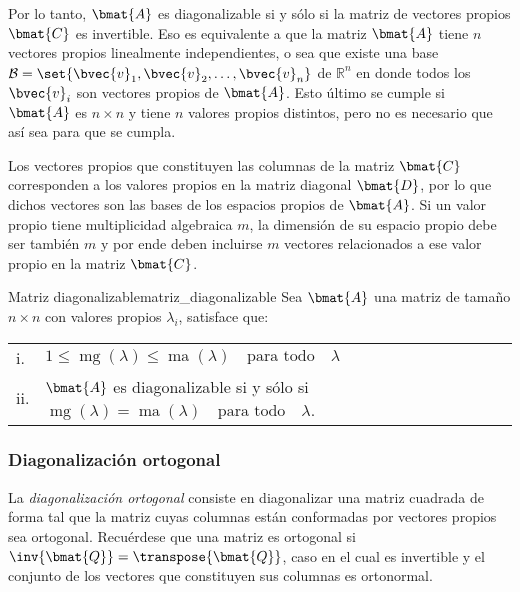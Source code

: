 \documentclass{fmbnotes}
\begin{document}
Por lo tanto, \(\bmat{A}\) es diagonalizable si y sólo si la matriz de vectores propios \(\bmat{C}\) es invertible. Eso es equivalente a que la matriz \(\bmat{A}\) tiene \(n\) vectores propios linealmente independientes, o sea que existe una base \(\mathcal{B}=\set{\bvec{v}_1,\bvec{v}_2,\ldots,\bvec{v}_n}\) de \(\mathbb{R}^{n}\) en donde todos los \(\bvec{v}_i\) son vectores propios de \(\bmat{A}\). Esto último se cumple si \(\bmat{A}\) es \(n\times n\) y tiene \(n\) valores propios distintos, pero no es necesario que así sea para que se cumpla.

Los vectores propios que constituyen las columnas de la matriz  \(\bmat{C}\) corresponden a los valores propios en la matriz diagonal \(\bmat{D}\), por lo que dichos vectores son las bases de los espacios propios de \(\bmat{A}\). Si un valor propio tiene multiplicidad algebraica \(m\), la dimensión de su espacio propio debe ser también \(m\) y por ende deben incluirse \(m\) vectores relacionados a ese valor propio en la matriz \(\bmat{C}\).

\begin{teorema}{Matriz diagonalizable}{matriz_diagonalizable}
	Sea \(\bmat{A}\) una matriz de tamaño \(n\times n\) con valores propios \(\lambda_i\), satisface que:
	\begin{longtable}{ll}
		\rule[1ex]{0pt}{2.5ex}i.&\(1 \leq \operatorname{mg}(\lambda)\leq\operatorname{ma}(\lambda) \quad \text{para todo} \quad \lambda\) \\
		\rule[1ex]{0pt}{2.5ex}ii.&\(\bmat{A}\) es diagonalizable si y sólo si \( \operatorname{mg}(\lambda)=\operatorname{ma}(\lambda) \quad \text{para todo} \quad \lambda \). \\
	\end{longtable}
\end{teorema}

\subsubsection{Diagonalización ortogonal}

La \emph{diagonalización ortogonal} consiste en diagonalizar una matriz cuadrada de forma tal que la matriz cuyas columnas están conformadas por vectores propios sea ortogonal. Recuérdese que una matriz es ortogonal si \(\inv{\bmat{Q}}=\transpose{\bmat{Q}}\), caso en el cual es invertible y el conjunto de los vectores que constituyen sus columnas es ortonormal.
\end{document}
